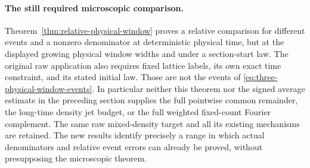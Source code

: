 \paragraph{The still required microscopic comparison.}
Theorem~\ref{thm:relative-physical-window} proves a relative comparison
for different events and a nonzero denominator at deterministic
physical time, but at the displayed growing physical window widths
and under a section-start law. The original raw application also
requires fixed lattice labels, its own exact time constraint, and
its stated initial law. Those are not the events of
\eqref{eq:three-physical-window-events}. In particular neither this
theorem nor the signed average estimate in the preceding section
supplies the full pointwise common remainder, the long-time density
jet budget, or the full weighted fixed-count Fourier complement.
The same raw mixed-density target and all its existing mechanisms
are retained. The new results identify precisely a range in which
actual denominators and relative event errors can already be proved,
without presupposing the microscopic theorem.
